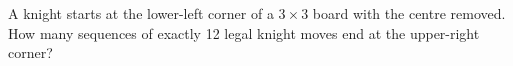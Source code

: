 A knight starts at the lower-left corner of a $3\times3$ board with the centre removed. How many sequences of exactly 12 legal knight moves end at the upper-right corner?
